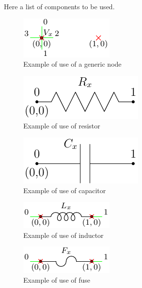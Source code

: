 \documentclass[a4paper,12pt]{article}
\begin{document}
Here a list of components to be used. 

\begin{figure}[h]
\centering
\includegraphics{nodeInfo}
\caption{Example of use of a generic node}
\label{nodeInfo} %
\end{figure}


\begin{figure}[h]
\centering
\includegraphics{resistorInfo}
\caption{Example of use of resistor}
\label{resistorInfo} %
\end{figure}

\begin{figure}[h]
\centering
\includegraphics{capacitorInfo}
\caption{Example of use of capacitor}
\label{capaciorInfo} %
\end{figure}

\begin{figure}[h]
\centering
\includegraphics{inductorInfo}
\caption{Example of use of inductor}
\label{inductorInfo} %
\end{figure}

\begin{figure}[h]
\centering
\includegraphics{fuseInfo}
\caption{Example of use of fuse}
\label{fuseInfo} %
\end{figure}
\end{document}

